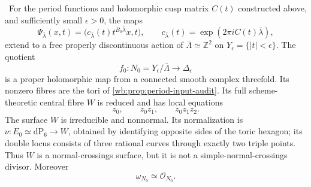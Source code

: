 \begin{theorem}
\label{wb:thm:candidate-cusp-geometry}
\ For the period functions and holomorphic cusp matrix \(C(t)\)
constructed above, and sufficiently small \(\epsilon>0\), the maps
\[
 \Psi_{\bar\lambda}(x,t)=
 \bigl(c_{\bar\lambda}(t)t^{B_0\bar\lambda}x,t\bigr),
 \qquad
 c_{\bar\lambda}(t)=\exp(2\pi iC(t)\bar\lambda),
\tag{2.5}
\]
extend to a free properly discontinuous action of
\(\bar\Lambda\simeq\mathbb Z^2\) on
\(Y_\epsilon=\{|t|<\epsilon\}\).  The quotient
\[
 f_0:N_0=Y_\epsilon/\bar\Lambda\longrightarrow\Delta_\epsilon
\]
is a proper holomorphic map from a connected smooth complex threefold.
Its nonzero fibres are the tori of \cref{wb:prop:period-input-audit}.  Its full
scheme-theoretic central fibre \(W\) is reduced and has local equations
\[
 z_0,\qquad z_0z_1,\qquad z_0z_1z_2.
\tag{2.6}
\]
The surface \(W\) is irreducible and nonnormal.  Its normalization is
\(\nu:E_0\simeq\mathrm{dP}_6\to W\), obtained by identifying opposite sides
of the toric hexagon; its double locus consists of three rational curves
through exactly two triple points.  Thus \(W\) is a normal-crossings surface,
but it is not a simple-normal-crossings divisor.  Moreover
\[
 \omega_{N_0}\simeq\mathcal O_{N_0}.
\tag{2.6a}
\]
\end{theorem}


